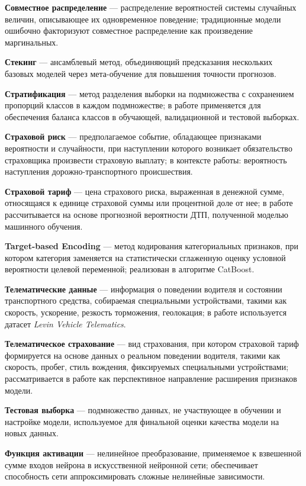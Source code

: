 \textbf{Совместное распределение} --- распределение вероятностей системы случайных величин, описывающее их одновременное поведение; традиционные модели ошибочно факторизуют совместное распределение как произведение маргинальных.

\textbf{Стекинг} --- ансамблевый метод, объединяющий предсказания нескольких базовых моделей через мета-обучение для повышения точности прогнозов.

\textbf{Стратификация} --- метод разделения выборки на подмножества с сохранением пропорций классов в каждом подмножестве; в работе применяется для обеспечения баланса классов в обучающей, валидационной и тестовой выборках.

\textbf{Страховой риск} --- предполагаемое событие, обладающее признаками вероятности и случайности, при наступлении которого возникает обязательство страховщика произвести страховую выплату; в контексте работы: вероятность наступления дорожно-транспортного происшествия.

\textbf{Страховой тариф} --- цена страхового риска, выраженная в денежной сумме, относящаяся к единице страховой суммы или процентной доле от нее; в работе рассчитывается на основе прогнозной вероятности ДТП, полученной моделью машинного обучения.

\textbf{Target-based Encoding} --- метод кодирования категориальных признаков, при котором категория заменяется на статистически сглаженную оценку условной вероятности целевой переменной; реализован в алгоритме CatBoost.

\textbf{Телематические данные} --- информация о поведении водителя и состоянии транспортного средства, собираемая специальными устройствами, такими как скорость, ускорение, резкость торможения, геолокация; в работе используется датасет \textit{Levin Vehicle Telematics}.

\textbf{Телематическое страхование} --- вид страхования, при котором страховой тариф формируется на основе данных о реальном поведении водителя, такими как скорость, пробег, стиль вождения, фиксируемых специальными устройствами; рассматривается в работе как перспективное направление расширения признаков модели.

\textbf{Тестовая выборка} --- подмножество данных, не участвующее в обучении и настройке модели, используемое для финальной оценки качества модели на новых данных.

\textbf{Функция активации} --- нелинейное преобразование, применяемое к взвешенной сумме входов нейрона в искусственной нейронной сети; обеспечивает способность сети аппроксимировать сложные нелинейные зависимости.

